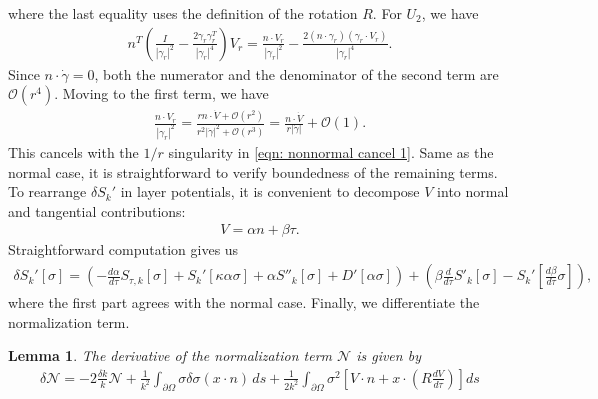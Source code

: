\documentclass{amsart}
\theoremstyle{plain}
\newtheorem{lemma}[theorem]{Lemma}
\begin{document}
where the last equality uses the definition of the rotation $R$.
For $U_2$, we have 
  \begin{align}
    n^T\left(\frac{I}{|\gamma_r|^2}-\frac{2\gamma_r\gamma_r^T}{|\gamma_r|^4}\right)V_r
    =\frac{n\cdot V_r}{|\gamma_r|^2}-\frac{2(n\cdot\gamma_r)(\gamma_r\cdot V_r)}{|\gamma_r|^4}.
  \end{align}
Since $n\cdot\dot\gamma=0$, both the numerator and the denominator of the second term are $\mathcal{O}(r^4)$.
Moving to the first term, we have 
  \begin{align}\label{eqn: nonnormal cancel 2}
    \frac{n\cdot V_r}{|\gamma_r|^2}
    =\frac{rn\cdot\dot V+\mathcal{O}(r^2)}{r^2|\dot\gamma|^2+\mathcal{O}(r^3)}
    =\frac{n\cdot\dot V}{r|\dot\gamma|}+\mathcal{O}(1).
  \end{align}
This cancels with the $1/r$ singularity in \eqref{eqn: nonnormal cancel 1}.
Same as the normal case, it is straightforward to verify boundedness of the remaining terms.
To rearrange $\delta S_k'$ in layer potentials, it is convenient to decompose $V$ into normal and tangential contributions:
    \begin{align}
        V=\alpha n+\beta \tau.
    \end{align}
% 
Straightforward computation gives us 
    \begin{align}
    \delta S_k'[\sigma] = \left(-\frac{d\alpha}{d\tau}S_{\tau,k}[\sigma]+S_k'[\kappa\alpha\sigma]+\alpha S''_k[\sigma]+D'[\alpha\sigma]\right)
    +\left(\beta\frac{d}{d\tau}S'_k[\sigma]-S_k'\left[\frac{d\beta}{d\tau}\sigma\right]\right),
  \end{align}
where the first part agrees with the normal case.
Finally, we differentiate the normalization term.
\begin{lemma}
  The derivative of the normalization term $\mathcal{N}$ is given by
  \begin{align}
    \delta \mathcal{N} = 
    -2\frac{\delta k}{k}\mathcal{N}
    +\frac{1}{k^2}\int_{\partial\Omega} \sigma\delta\sigma(x\cdot n)\,ds
    +\frac{1}{2k^2}\int_{\partial\Omega}\sigma^2\left[V\cdot n+x \cdot\left(R\frac{dV}{d\tau}\right)\right]ds
  \end{align}
\end{lemma}
\end{document}
